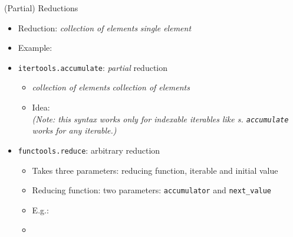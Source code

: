 \begin{frame}{(Partial) Reductions}
%
\begin{itemize}
\item Reduction: \emph{collection of elements} \thus \emph{single element}
\item Example: 
\item \texttt{itertools.accumulate}: \emph{partial} reduction
	\begin{itemize}
	\item \emph{collection of elements} \thus \emph{collection of elements}
	\item Idea: \\
		\emph{(Note: this syntax works only for indexable iterables like s. \texttt{accumulate} works for any iterable.)}
	\end{itemize}
\item \texttt{functools.reduce}: arbitrary reduction
	\begin{itemize}
	\item Takes three parameters: reducing function, iterable and initial value
	\item Reducing function: two parameters: \texttt{accumulator} and \texttt{next\_value}
	\item E.\;g.: 
	\item {}
	\end{itemize}
\end{itemize}
%
\end{frame}


